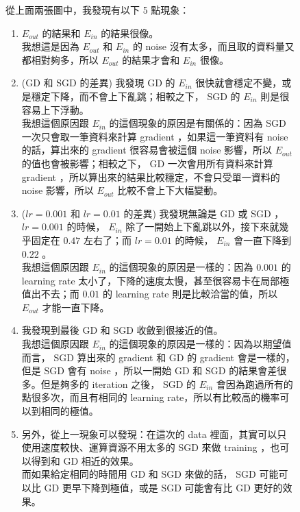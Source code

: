 \documentclass[12pt,a4paper]{article}
\theoremstyle{remark}
\begin{document}
\begin{figure}[h]
從上面兩張圖中，我發現有以下 5 點現象：
\begin{enumerate}
	\item $E_{out}$ 的結果和 $E_{in}$ 的結果很像。\\
	我想這是因為 $E_{out}$ 和 $E_{in}$ 的 noise 沒有太多，而且取的資料量又都相對夠多，所以 $E_{out}$ 的結果才會和 $E_{in}$ 很像。
	\item (GD 和 SGD 的差異) 我發現 GD 的 $E_{in}$ 很快就會穩定不變，或是穩定下降，而不會上下亂跳；相較之下， SGD 的 $E_{in}$ 則是很容易上下浮動。 \\
	我想這個原因跟 $E_{in}$ 的這個現象的原因是有關係的：因為 SGD 一次只會取一筆資料來計算 gradient ，如果這一筆資料有 noise 的話，算出來的 gradient 很容易會被這個 noise 影響，所以 $E_{out}$ 的值也會被影響；相較之下， GD 一次會用所有資料來計算 gradient ，所以算出來的結果比較穩定，不會只受單一資料的 noise 影響，所以 $E_{out}$ 比較不會上下大幅變動。
	\item ($lr = 0.001$ 和 $lr = 0.01$ 的差異) 我發現無論是 GD 或 SGD ， $lr = 0.001$ 的時候， $E_{in}$ 除了一開始上下亂跳以外，接下來就幾乎固定在 $0.47$ 左右了；而 $lr = 0.01$ 的時候， $E_{in}$ 會一直下降到 $0.22$ 。 \\
	我想這個原因跟 $E_{in}$ 的這個現象的原因是一樣的：因為 $0.001$ 的 learning rate 太小了，下降的速度太慢，甚至很容易卡在局部極值出不去；而 $0.01$ 的 learning rate 則是比較洽當的值，所以 $E_{out}$ 才能一直下降。
	\item 我發現到最後 GD 和 SGD 收斂到很接近的值。\\
	我想這個原因跟 $E_{in}$ 的這個現象的原因是一樣的：因為以期望值而言， SGD 算出來的 gradient 和 GD 的 gradient 會是一樣的，但是 SGD 會有 noise ，所以一開始 GD 和 SGD 的結果會差很多。但是夠多的 iteration 之後， SGD 的 $E_{in}$ 會因為跑過所有的點很多次，而且有相同的 learning rate，所以有比較高的機率可以到相同的極值。
	\item 另外，從上一現象可以發現：在這次的 data 裡面，其實可以只使用速度較快、運算資源不用太多的 SGD 來做 training ，也可以得到和 GD 相近的效果。\\
	而如果給定相同的時間用 GD 和 SGD 來做的話， SGD 可能可以比 GD 更早下降到極值，或是 SGD 可能會有比 GD 更好的效果。
\end{enumerate}
\end{figure}
\end{document}
